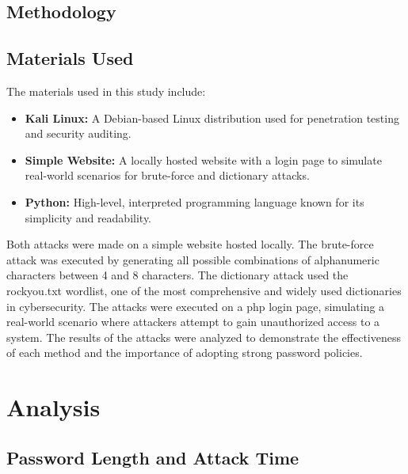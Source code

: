 \documentclass{comjnl}
\begin{document}
\newpage
\subsection{Methodology}

\subsection*{Materials Used}

The materials used in this study include:

\begin{itemize}
  \item \textbf{Kali Linux:} A Debian-based Linux distribution used for penetration testing and security auditing. 
  \item \textbf{Simple Website:} A locally hosted website with a login page to simulate real-world scenarios for brute-force and dictionary attacks.
  \item \textbf{Python:} High-level, interpreted programming language known for its simplicity and readability.
\end{itemize}

Both attacks were made on a simple website hosted locally. The brute-force attack was executed by generating all possible combinations of alphanumeric characters between 4 and 8 characters. The dictionary attack used the rockyou.txt wordlist, one of the most comprehensive and widely used dictionaries in cybersecurity. The attacks were executed on a php login page, simulating a real-world scenario where attackers attempt to gain unauthorized access to a system. The results of the attacks were analyzed to demonstrate the effectiveness of each method and the importance of adopting strong password policies.

\section{Analysis}
\subsection{Password Length and Attack Time}
\end{document}
